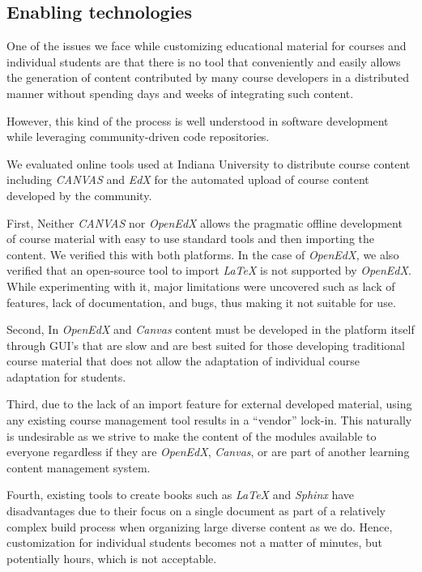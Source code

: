 \documentclass[conference]{IEEEtran}
\begin{document}
\subsection{Enabling technologies}

One of the issues we face while customizing educational material for
courses and individual students are that there is no tool that
conveniently and easily allows the generation of content contributed
by many course developers in a distributed manner without spending
days and weeks of integrating such content.

However, this kind of
the process is well understood in software development while leveraging
community-driven code repositories.



We evaluated online tools used at
Indiana University to distribute course content including {\em CANVAS}
and {\em EdX} for the automated upload of course content developed by
the community.


First, Neither \emph{CANVAS} nor \emph{OpenEdX} allows the pragmatic
offline development of course material with easy to use standard tools
and then importing the content. We verified this with both platforms. In
the case of \emph{OpenEdX,} we also verified that an open-source tool to
import \emph{LaTeX} is not supported by \emph{OpenEdX}. While
experimenting with it, major limitations were uncovered such as lack of
features, lack of documentation, and bugs, thus making it not suitable
for use.

Second, In \emph{OpenEdX} and \emph{Canvas} content must be developed in
the platform itself through GUI's that are slow and are best suited for
those developing traditional course material that does not allow the
adaptation of individual course adaptation for students.

Third, due to the lack of an import feature for external developed
material, using any existing course management tool results in a
``vendor'' lock-in. This naturally is undesirable as we strive to make
the content of the modules available to everyone regardless if they are
\emph{OpenEdX}, \emph{Canvas}, or are part of another learning content
management system.

Fourth, existing tools to create books such as \emph{LaTeX} and
\emph{Sphinx} have disadvantages due to their focus on a single document
as part of a relatively complex build process when organizing large
diverse content as we do. Hence, customization for individual students
becomes not a matter of minutes, but potentially hours, which is not
acceptable.
\end{document}
